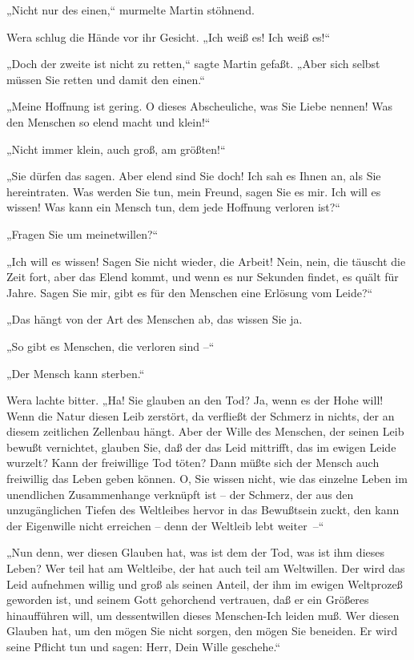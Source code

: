 „Nicht nur des einen,“ murmelte Martin stöhnend.

Wera schlug die Hände vor ihr Gesicht. „Ich weiß es! Ich weiß es!“

„Doch der zweite ist nicht zu retten,“ sagte Martin gefaßt. „Aber
sich selbst müssen Sie retten und damit den einen.“

„Meine Hoffnung ist gering. O dieses Abscheuliche, was Sie Liebe
nennen! Was den Menschen so elend macht und klein!“

„Nicht immer klein, auch groß, am größten!“

„Sie dürfen das sagen. Aber elend sind Sie doch! Ich sah es Ihnen
an, als Sie hereintraten. Was werden Sie tun, mein Freund, sagen
Sie es mir. Ich will es wissen! Was kann ein Mensch tun, dem jede
Hoffnung verloren ist?“

„Fragen Sie um meinetwillen?“

„Ich will es wissen! Sagen Sie nicht wieder, die Arbeit! Nein,
nein, die täuscht die Zeit fort, aber das Elend kommt, und wenn es
nur Sekunden findet, es quält für Jahre. Sagen Sie mir, gibt es für
den Menschen eine Erlösung vom Leide?“

„Das hängt von der Art des Menschen ab, das wissen Sie ja.

„So gibt es Menschen, die verloren sind –“

„Der Mensch kann sterben.“

Wera lachte bitter. „Ha! Sie glauben an den Tod? Ja, wenn es der
Hohe will! Wenn die Natur diesen Leib zerstört, da verfließt der
Schmerz in nichts, der an diesem zeitlichen Zellenbau hängt. Aber
der Wille des Menschen, der seinen Leib bewußt vernichtet, glauben
Sie, daß der das Leid mittrifft, das im ewigen Leide wurzelt? Kann
der freiwillige Tod töten? Dann müßte sich der Mensch auch
freiwillig das Leben geben können. O, Sie wissen nicht, wie das
einzelne Leben im unendlichen Zusammenhange verknüpft ist – der
Schmerz, der aus den unzugänglichen Tiefen des Weltleibes hervor in
das Bewußtsein zuckt, den kann der Eigenwille nicht erreichen –
denn der Weltleib lebt weiter~–“

„Nun denn, wer diesen Glauben hat, was ist dem der Tod, was ist ihm
dieses Leben? Wer teil hat am Weltleibe, der hat auch teil am
Weltwillen. Der wird das Leid aufnehmen willig und groß als seinen
Anteil, der ihm im ewigen Weltprozeß geworden ist, und seinem Gott
gehorchend vertrauen, daß er ein Größeres hinaufführen will, um
dessentwillen dieses Menschen-Ich leiden muß. Wer diesen Glauben
hat, um den mögen Sie nicht sorgen, den mögen Sie beneiden. Er wird
seine Pflicht tun und sagen: Herr, Dein Wille geschehe.“

